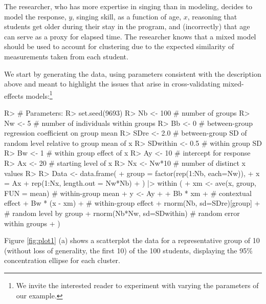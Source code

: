 \documentclass[
]{jss}
\begin{document}
The researcher, who has more expertise in singing than in modeling,
decides to model the response, \(y\), singing skill, as a function of
age, \(x\), reasoning that students get older during their stay in the
program, and (incorrectly) that age can serve as a proxy for elapsed
time. The researcher knows that a mixed model should be used to account
for clustering due to the expected similarity of measurements taken from
each student.

We start by generating the data, using parameters consistent with the
description above and meant to highlight the issues that arise in
cross-validating mixed-effects models:\footnote{We invite the interested
  reader to experiment with varying the parameters of our example.}

\begin{CodeChunk}
\begin{CodeInput}
R> # Parameters:
R> set.seed(9693) 
R> Nb <- 100     # number of groups
R> Nw <- 5       # number of individuals within groups
R> Bb <- 0       # between-group regression coefficient on group mean
R> SDre <- 2.0   # between-group SD of random level relative to group mean of x
R> SDwithin <- 0.5  # within group SD
R> Bw <- 1          # within group effect of x
R> Ay <- 10         # intercept for response
R> Ax <- 20         # starting level of x
R> Nx <- Nw*10      # number of distinct x values
R> 
R> Data <- data.frame(
+   group = factor(rep(1:Nb, each=Nw)),
+   x = Ax + rep(1:Nx, length.out = Nw*Nb)
+ ) |> within ({
+   xm  <- ave(x, group, FUN = mean) # within-group mean
+   y <- Ay +
+     Bb * xm +                    # contextual effect
+     Bw * (x - xm) +              # within-group effect
+     rnorm(Nb, sd=SDre)[group] +  # random level by group
+     rnorm(Nb*Nw, sd=SDwithin)    # random error within groups
+ })
\end{CodeInput}
\end{CodeChunk}

Figure \ref{fig:plot1} (a) shows a scatterplot the data for a
representative group of 10 (without loss of generality, the first 10) of
the 100 students, displaying the 95\% concentration ellipse for each
cluster.
\end{document}
